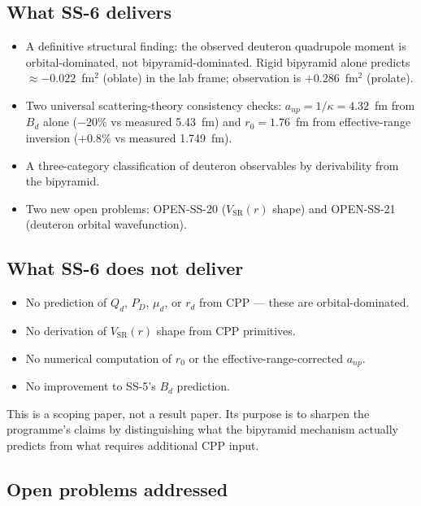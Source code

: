 \documentclass[11pt,letterpaper]{article}
\newcommand{\Bd}{B_{d}}
\newcommand{\Qd}{Q_{d}}
\newcommand{\PD}{P_{D}}
\newcommand{\mud}{\mu_{d}}
\newcommand{\anp}{a_{np}}
\newcommand{\rzero}{r_{0}}
\newcommand{\VSR}{V_{\mathrm{SR}}}
\begin{document}
\subsection{What SS-6 delivers}

\begin{itemize}
\item A definitive structural finding: the observed deuteron quadrupole moment is orbital-dominated, not bipyramid-dominated. Rigid bipyramid alone predicts $\approx -0.022$~fm$^2$ (oblate) in the lab frame; observation is $+0.286$~fm$^2$ (prolate).
\item Two universal scattering-theory consistency checks: $\anp = 1/\kappa = 4.32$~fm from $\Bd$ alone ($-20\%$ vs measured 5.43~fm) and $\rzero = 1.76$~fm from effective-range inversion ($+0.8\%$ vs measured 1.749~fm).
\item A three-category classification of deuteron observables by derivability from the bipyramid.
\item Two new open problems: OPEN-SS-20 ($\VSR(r)$ shape) and OPEN-SS-21 (deuteron orbital wavefunction).
\end{itemize}

\subsection{What SS-6 does not deliver}

\begin{itemize}
\item No prediction of $\Qd$, $\PD$, $\mud$, or $r_d$ from CPP --- these are orbital-dominated.
\item No derivation of $\VSR(r)$ shape from CPP primitives.
\item No numerical computation of $\rzero$ or the effective-range-corrected $\anp$.
\item No improvement to SS-5's $\Bd$ prediction.
\end{itemize}

This is a scoping paper, not a result paper. Its purpose is to sharpen the programme's claims by distinguishing what the bipyramid mechanism actually predicts from what requires additional CPP input.

\subsection{Open problems addressed}
\end{document}
